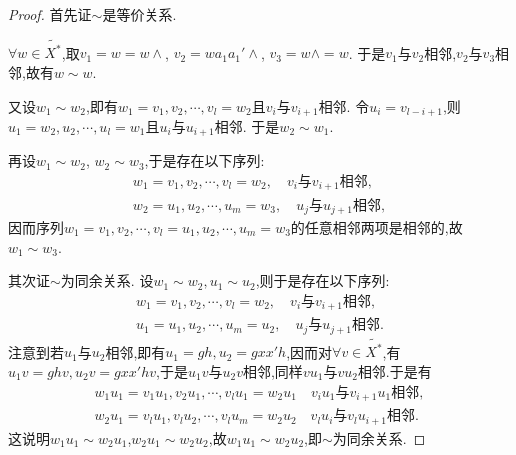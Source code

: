 \documentclass[../../main.tex]{subfiles}%
\begin{document}
\begin{proof}
首先证$\sim$是等价关系.

$\forall w\in \widetilde{X^*}$,取$v_1=w=w\land$, $v_2=wa_1a_1'\land$, $v_3=w\land=w$. 于是$v_1$与$v_2$相邻,$v_2$与$v_3$相邻,故有$w\sim w$.

又设$w_1\sim w_2$,即有$w_1=v_1,v_2,\cdots,v_l=w_2$且$v_i$与$v_{i+1}$相邻. 令$u_i=v_{l-i+1}$,则$u_1=w_2,u_2,\cdots,u_l=w_1$且$u_i$与$u_{i+1}$相邻. 于是$w_2\sim w_1$.

再设$w_1\sim w_2$, $w_2\sim w_3$,于是存在以下序列:
\begin{align*}
w_1 = v_1, v_2, \cdots, v_l = w_2,\quad v_i\text{与}v_{i+1}\text{相邻}, \\
w_2 = u_1, u_2, \cdots, u_m = w_3,\quad u_j\text{与}u_{j+1}\text{相邻},
\end{align*}
因而序列$w_1 = v_1,v_2,\cdots,v_l=u_1,u_2,\cdots,u_m=w_3$的任意相邻两项是相邻的,故$w_1\sim w_3$.

其次证$\sim$为同余关系. 设$w_1\sim w_2,u_1\sim u_2$,则于是存在以下序列:
\begin{align*}
w_1 = v_1, v_2, \cdots, v_l = w_2,\quad v_i\text{与}v_{i+1}\text{相邻}, \\
u_1 = u_1, u_2, \cdots, u_m = u_2,\quad u_j\text{与}u_{j+1}\text{相邻}.
\end{align*}
注意到若$u_1$与$u_2$相邻,即有$u_1=gh,u_2=gxx'h$,因而对$\forall v\in \tilde{X^*}$,有$u_1v=ghv,u_2v=gxx'hv$,于是$u_1v$与$u_2v$相邻,同样$vu_1$与$vu_2$相邻.于是有
\begin{gather*}
w_1u_1 = v_1u_1, v_2u_1, \cdots, v_lu_1 = w_2u_1\quad v_iu_1\text{与}v_{i+1}u_1\text{相邻},
\\
w_2u_1 = v_lu_1, v_lu_2, \cdots, v_lu_m = w_2u_2\quad v_lu_i\text{与}v_lu_{i+1}\text{相邻}.
\end{gather*}
这说明$w_1u_1\sim w_2u_1$,$w_2u_1\sim w_2u_2$,故$w_1u_1\sim w_2u_2$,即$\sim$为同余关系.


\end{proof}
\end{document}
